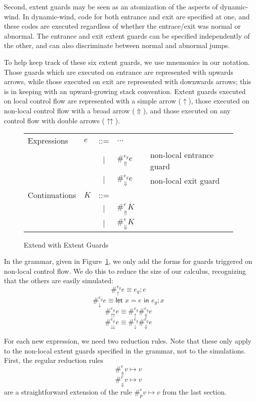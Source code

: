 \documentclass[11pt]{article}
\newcommand{\letin}[2]{\textsf{let }#1\textsf{ in }#2}
\begin{document}
Second, extent guards may be seen as an atomization of the aspects of dynamic-wind.
In dynamic-wind, code for both entrance and exit are specified at one, and these codes are executed regardless of whether the entrace/exit was normal or abnormal.
The entrance and exit extent guards can be specified independently of the other, and can also discriminate between normal and abnormal jumps.

To help keep track of these six extent guards, we use mnemonics in our notation.
Those guards which are executed on entrance are represented with upwards arrows, while those executed on exit are represented with downwards arrows; this is in keeping with an upward-growing stack convention.
Extent guards executed on local control flow are represented with a simple arrow ($\uparrow$), those executed on non-local control flow with a broad arrow ($\Uparrow$), and those executed on any control flow with double arrows ($\upuparrows$).

\begin{figure}[H]
\caption{Extend with Extent Guards}
\label{fig:addGuards}

\begin{tabular}{llclll}
Expressions & $e$ & ::= & $\ldots$ &  \\
& & $|$ & $\#_\Uparrow^{e_g}e$ && non-local entrance guard \\
& & $|$ & $\#_\Downarrow^{e_g}e$ && non-local exit guard \\
Continuations & $K$ & ::= & \\
& & $|$ & $\#_{\Uparrow}^{e}K$ &&  \\
& & $|$ & $\#_{\Downarrow}^{e}K$ &&  \\
\end{tabular}
\end{figure}

In the grammar, given in Figure~\ref{fig:addGuards}, we only add the forms for guards triggered on non-local control flow.
We do this to reduce the size of our calculus, recognizing that the others are easily simulated:
$$\#_\uparrow^{e_g}e \equiv e_g; e$$
$$\#_\downarrow^{e_g}e \equiv \letin{x=e}{e_g; x}$$
$$\#_\upuparrows^{e_g}e \equiv \#_\uparrow^{e_g}\#_\Uparrow^{e_g}e$$
$$\#_\downdownarrows^{e_g}e \equiv \#_\downarrow^{e_g}\#_\Downarrow^{e_g}e$$


For each new expression, we need two reduction rules.
Note that these only apply to the non-local extent guards specified in the grammar, not to the simulations.
First, the regular reduction rules
$$\#_{\Uparrow}^{e}v \mapsto v$$
$$\#_{\Downarrow}^{e}v \mapsto v$$
are a straightforward extension of the rule $\#_{p}^{e}v \mapsto v$ from the last section.
\end{document}
